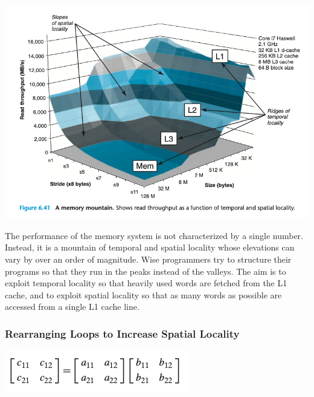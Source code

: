 \documentclass[11pt]{article}
\begin{document}
\begin{center}
\includegraphics[width=.9\linewidth]{pics/figure6.41-memory-mountain.png}
\end{center}


The performance of the memory system is not characterized by a single number. Instead, it is a mountain of temporal and spatial locality whose elevations can vary by over an order of magnitude. Wise programmers try to structure their programs so that they run in the peaks instead of the valleys. The aim is to exploit temporal locality so that heavily used words are fetched from the L1 cache, and to exploit spatial locality so that as many words as possible are accessed from a single L1 cache line.\\


\subsubsection{Rearranging Loops to Increase Spatial Locality}
\label{sec:org57127b9}

\begin{center}
\includegraphics[width=.9\linewidth]{pics/matrix-multiplication.png}
\end{center}
\end{document}
